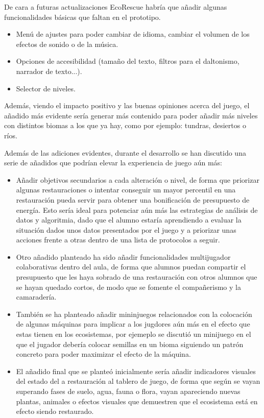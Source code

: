 De cara a futuras actualizaciones EcoRescue habría que añadir algunas funcionalidades básicas que faltan en el prototipo. 
\begin{itemize}
    \item Menú de ajustes para poder cambiar de idioma, cambiar el volumen de los efectos de sonido o de la música.
    \item Opciones de accesibilidad (tamaño del texto, filtros para el daltonismo, narrador de texto...).
    \item Selector de niveles.
\end{itemize}

Además, viendo el impacto positivo y las buenas opiniones acerca del juego, el añadido más evidente sería generar más contenido para poder añadir más niveles con distintos biomas a los que ya hay, como por ejemplo: tundras, desiertos o ríos.

Además de las adiciones evidentes, durante el desarrollo se han discutido una serie de añadidos que podrían elevar la experiencia de juego aún más:
\begin{itemize}
    \item Añadir objetivos secundarios a cada alteración o nivel, de forma que priorizar algunas restauraciones o intentar conseguir un mayor percentil en una restauración pueda servir para obtener una bonificación de presupuesto de energía. Esto sería ideal para potenciar aún más las estrategias de análisis de datos y algoritmia, dado que el alumno estaría aprendiendo a evaluar la situación dados unos datos presentados por el juego y a priorizar unas acciones frente a otras dentro de una lista de protocolos a seguir.
    \item Otro añadido planteado ha sido añadir funcionalidades multijugador colaborativas dentro del aula, de forma que alumnos puedan compartir el presupuesto que les haya sobrado de una restauración con otros alumnos que se hayan quedado cortos, de modo que se fomente el compañerismo y la camaradería.
    \item También se ha planteado añadir mininjuegos relacionados con la colocación de algunas máquinas para implicar a los jugdores aún más en el efecto que estas tienen en los ecosistemas, por ejemeplo se discutió un minijuego en el que el jugador debería colocar semillas en un bioma siguiendo un patrón concreto para poder maximizar el efecto de la máquina. 
    \item El añadido final que se planteó inicialmente sería añadir indicadores visuales del estado del a restauración al tablero de juego, de forma que según se vayan superando fases de suelo, agua, fauna o flora, vayan apareciendo nuevas plantas, animales o efectos visuales que demuestren que el ecosistema está en efecto siendo restaurado. 
\end{itemize}

